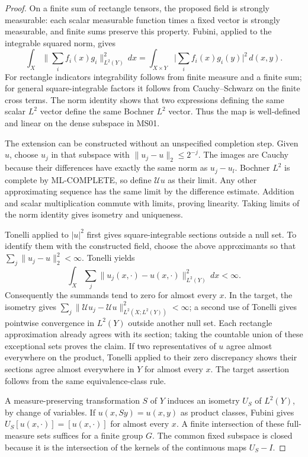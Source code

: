 \documentclass[11pt,a4paper]{article}
\theoremstyle{remark}\newtheorem{remark}[theorem]{Remark}
\begin{document}
\begin{proof}
On a finite sum of rectangle tensors, the proposed field is strongly measurable: each scalar measurable function times a fixed vector is strongly measurable, and finite sums preserve this property. Fubini, applied to the integrable squared norm, gives
\[
 \int_X\Big\|\sum_i f_i(x)g_i\Big\|_{L^2(Y)}^2\,dx
 =\int_{X\times Y}\Big|\sum_i f_i(x)g_i(y)\Big|^2\,d(x,y).
\]
For rectangle indicators integrability follows from finite measure and a finite sum; for general square-integrable factors it follows from Cauchy--Schwarz on the finite cross terms. The norm identity shows that two expressions defining the same scalar $L^2$ vector define the same Bochner $L^2$ vector. Thus the map is well-defined and linear on the dense subspace in MS01.

The extension can be constructed without an unspecified completion step. Given $u$, choose $u_j$ in that subspace with $\|u_j-u\|_2\leq2^{-j}$. The images are Cauchy because their differences have exactly the same norm as $u_j-u_l$. Bochner $L^2$ is complete by ML-COMPLETE, so define $\mathscr Uu$ as their limit. Any other approximating sequence has the same limit by the difference estimate. Addition and scalar multiplication commute with limits, proving linearity. Taking limits of the norm identity gives isometry and uniqueness.

Tonelli applied to $|u|^2$ first gives square-integrable sections outside a null set. To identify them with the constructed field, choose the above approximants so that $\sum_j\|u_j-u\|_2^2<\infty$. Tonelli yields
\[
 \int_X\sum_j\|u_j(x,\cdot)-u(x,\cdot)\|_{L^2(Y)}^2\,dx<\infty.
\]
Consequently the summands tend to zero for almost every $x$. In the target, the isometry gives $\sum_j\|\mathscr Uu_j-\mathscr Uu\|_{L^2(X;L^2(Y))}^2<\infty$; a second use of Tonelli gives pointwise convergence in $L^2(Y)$ outside another null set. Each rectangle approximation already agrees with its section; taking the countable union of these exceptional sets proves the claim. If two representatives of $u$ agree almost everywhere on the product, Tonelli applied to their zero discrepancy shows their sections agree almost everywhere in $Y$ for almost every $x$. The target assertion follows from the same equivalence-class rule.

A measure-preserving transformation $S$ of $Y$ induces an isometry $U_S$ of $L^2(Y)$, by change of variables. If $u(x,Sy)=u(x,y)$ as product classes, Fubini gives $U_S[u(x,\cdot)]=[u(x,\cdot)]$ for almost every $x$. A finite intersection of these full-measure sets suffices for a finite group $G$. The common fixed subspace is closed because it is the intersection of the kernels of the continuous maps $U_S-I$.


\end{proof}
\end{document}
